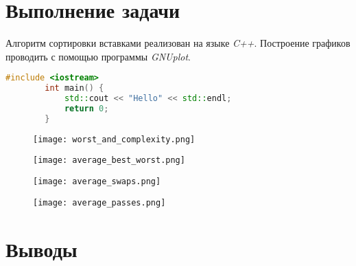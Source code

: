 \documentclass[12pt, a4paper]{report}
\begin{document}
	\section*{Выполнение задачи}
	Алгоритм сортировки вставками реализован на языке \textit{C++}. Построение графиков проводить с помощью программы \textit{GNUplot}.
	\lstset{style=mystyle}
	\begin{lstlisting}[language=C++]
		#include <iostream>
		int main() {
			std::cout << "Hello" << std::endl;
			return 0;
		}
	\end{lstlisting}
	\begin{figure}
		\texttt{[image: worst\_and\_complexity.png]}
	\end{figure}
	\begin{figure}
		\texttt{[image: average\_best\_worst.png]}
	\end{figure}
	\begin{figure}
		\texttt{[image: average\_swaps.png]}
	\end{figure}
	\begin{figure}
		\texttt{[image: average\_passes.png]}
	\end{figure}

	\section*{Выводы}
		
\end{document}
